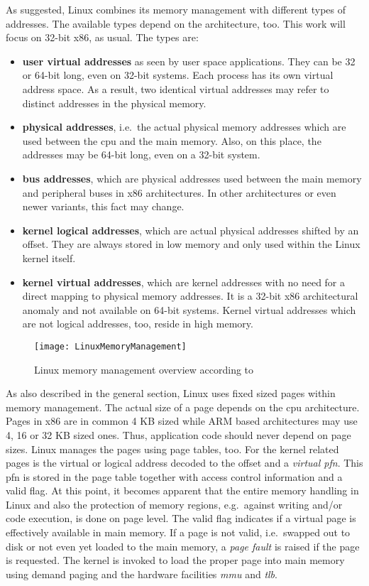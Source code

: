 As suggested, Linux combines its memory management with different types of addresses.
The available types depend on the architecture, too.
This work will focus on 32-bit x86, as usual.
The types are:
\begin{itemize}
    \item \textbf{user virtual addresses} as seen by user space applications. They can be 32 or 64-bit long, even on 32-bit systems. Each process has its own virtual address space. As a result, two identical virtual addresses may refer to distinct addresses in the physical memory.
    \item \textbf{physical addresses}, i.e.\ the actual physical memory addresses which are used between the \ac{cpu} and the main memory. Also, on this place, the addresses may be 64-bit long, even on a 32-bit system.
    \item \textbf{bus addresses}, which are physical addresses used between the main memory and peripheral buses in x86 architectures. In other architectures or even newer variants, this fact may change.
    \item \textbf{kernel logical addresses}, which are actual physical addresses shifted by an offset. They are always stored in low memory and only used within the Linux kernel itself.
    \item \textbf{kernel virtual addresses}, which are kernel addresses with no need for a direct mapping to physical memory addresses. It is a 32-bit x86 architectural anomaly and not available on 64-bit systems. Kernel virtual addresses which are not logical addresses, too, reside in high memory\cite{lfd430}.
\end{itemize}

\begin{figure} [t]
	\centering
	\texttt{[image: LinuxMemoryManagement]}
	\caption{Linux memory management overview according to~\cite{lfd430}}\label{pic:linux-mem}
\end{figure}

As also described in the general section, Linux uses fixed sized pages within memory management.
The actual size of a page depends on the \ac{cpu} architecture.
Pages in x86 are in common 4 KB sized while ARM based architectures may use 4, 16 or 32 KB sized ones. 
Thus, application code should never depend on page sizes.
Linux manages the pages using page tables, too.
For the kernel related pages is the virtual or logical address decoded to the offset and a \textit{virtual \ac{pfn}}.
This \ac{pfn} is stored in the page table together with access control information and a valid flag.
At this point, it becomes apparent that the entire memory handling in Linux and also the protection of memory regions, e.g.\ against writing and/or code execution, is done on page level.
The valid flag indicates if a virtual page is effectively available in main memory. 
If a page is not valid, i.e.\ swapped out to disk or not even yet loaded to the main memory, a \textit{page fault} is raised if the page is requested.
The kernel is invoked to load the proper page into main memory using demand paging and the hardware facilities \textit{\ac{mmu}} and \textit{\ac{tlb}}\cite{lfd430}.

